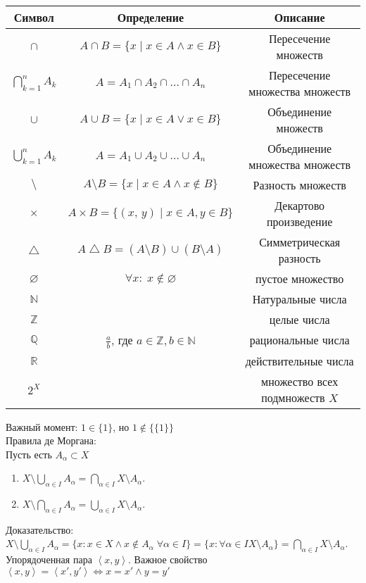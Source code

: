\documentclass[12pt]{article}
\begin{document}
\begin{center}
  \renewcommand{\arraystretch}{1.7}
  \begin{tabular}{| c | c | c |}
    \hline
    \textbf{Символ} & \textbf{Определение} & \textbf{Описание}\\
    \hline
    {\Large $\cap$} & $A \cap B = \{ x \mid x \in A \land x \in B\}$ & Пересечение множеств\\
    \hline
    {\Large $\bigcap_{k=1}^n A_k$} & $A = A_1 \cap A_2 \cap \ldots \cap A_n$ & Пересечение множества множеств \\
    \hline
    {\Large $\cup$} & $A \cup B = \{ x \mid x \in A \lor x \in B\}$ & Объединение множеств\\
    \hline
    {\Large $\bigcup_{k=1}^n A_k$} & $A = A_1 \cup A_2 \cup \ldots \cup A_n$ & Объединение множества множеств \\
    \hline
    {\Large $\setminus$} & $A \setminus B = \{ x \mid x \in A \land x \notin B\}$ & Разность множеств\\
    \hline
    {\Large $\times$} & $A \times B = \{ (x,\,y) \mid x \in A, y \in B\}$ & Декартово произведение\\
    \hline
    {\Large $\bigtriangleup$} & $A \bigtriangleup B = (A \setminus B) \cup (B \setminus A)$ & Симметрическая разность\\
    \hline
    {\Large $\varnothing$} & $\forall x: \; x \notin \varnothing$ & пустое множество\\ 
    \hline
    {\Large $\mathbb{N}$} & & Натуральные числа\\
    \hline
    {\Large $\mathbb{Z}$} & & целые числа \\
    \hline
    {\Large $\mathbb{Q}$} & $\frac{a}{b}$, где $a \in \mathbb{Z}, b \in \mathbb{N}$ & рациональные числа \\
    \hline
    {\Large $\mathbb{R}$} & & действительные числа \\
    \hline
    {\Large $2^X$} & & множество всех подмножеств $X$ \\
    \hline
  \end{tabular}
\end{center}
Важный момент: $1 \in \{1\}$, но  $1 \notin\{\{1\}\}$\\
Правила де Моргана:\\
Пусть есть $A_\alpha \subset X$
\begin{enumerate}
     \item $X \setminus \bigcup_{\alpha \in I} A_\alpha = \bigcap_{\alpha \in I} X \setminus A_\alpha$.
     \item $X \setminus \bigcap_{\alpha \in I} A_\alpha = \bigcup_{\alpha \in I} X \setminus A_\alpha$.
\end{enumerate}
Доказательство: $X \setminus \bigcup_{\alpha \in I} A_{\alpha} = \{x: x \in X \land x \notin A_{\alpha} \; \forall \alpha \in I\} = \{x: \forall \alpha \in I X \setminus A_{\alpha}\} = \bigcap_{\alpha \in I} X \setminus A_{\alpha}$.\\
Упорядоченная пара $\left<x,y\right>$. Важное свойство $\left<x, y\right> = \left<x',y'\right> \iff x = x' \land y = y'$\\
\\
\\
\end{document}
